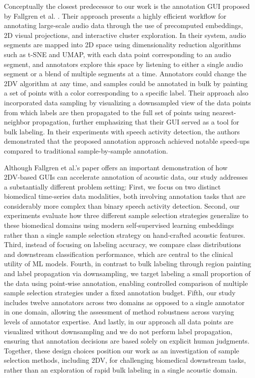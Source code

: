 \documentclass[a4paper,fleqn]{cas-dc}
\begin{document}
Conceptually the closest predecessor to our work is the annotation GUI proposed by Fallgren et al. \cite{fallgren_interspeech}. Their approach presents a highly efficient workflow for annotating large‑scale audio data through the use of precomputed embeddings, 2D visual projections, and interactive cluster exploration. In their system, audio segments are mapped into 2D space using dimensionality reduction algorithms such as t-SNE and UMAP, with each data point corresponding to an audio segment, and annotators explore this space by listening to either a single audio segment or a blend of multiple segments at a time. Annotators could change the 2DV algorithm at any time, and samples could be annotated in bulk by painting a set of points with a color corresponding to a specific label. Their approach also incorporated data sampling by visualizing a downsampled view of the data points from which labels are then propagated to the full set of points using nearest-neighbor propagation, further emphasizing that their GUI served as a tool for bulk labeling. In their experiments with speech activity detection, the authors demonstrated that the proposed annotation approach achieved notable speed-ups compared to traditional sample-by-sample annotation.

Although Fallgren et al.’s paper \cite{fallgren_interspeech} offers an important demonstration of how 2DV‑based GUIs can accelerate annotation of acoustic data, our study addresses a substantially different problem setting: First, we focus on two distinct biomedical time‑series data modalities, both involving annotation tasks that are considerably more complex than binary speech activity detection. Second, our experiments evaluate how three different sample selection strategies generalize to these biomedical domains using modern self‑supervised learning embeddings rather than a single sample selection strategy on hand‑crafted acoustic features. Third, instead of focusing on labeling accuracy, we compare class distributions and downstream classification performance, which are central to the clinical utility of ML models. Fourth, in contrast to bulk labeling through region painting and label propagation via downsampling, we target labeling a small proportion of the data using point‑wise annotation, enabling controlled comparison of multiple sample selection strategies under a fixed annotation budget. Fifth, our study includes twelve annotators across two domains as opposed to a single annotator in one domain, allowing the assessment of method robustness across varying levels of annotator expertise. And lastly, in our approach all data points are visualized without downsampling and we do not perform label propagation, ensuring that annotation decisions are based solely on explicit human judgments. Together, these design choices position our work as an investigation of sample selection methods, including 2DV, for challenging biomedical downstream tasks, rather than an exploration of rapid bulk labeling in a single acoustic domain.
\end{document}
